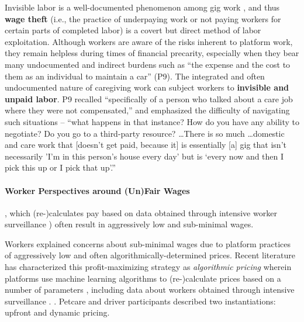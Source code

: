 {Invisible labor is a well-documented phenomenon among gig work \cite{l2xo,QNoU,EGjj,9Fa7}, and thus \textbf{wage theft} (i.e., the practice of underpaying work or not paying workers for certain parts of completed labor) is a covert but direct {method of labor exploitation}. 
Although workers are aware of the risks inherent to platform work, they remain helpless during times of financial precarity, especially when they bear many undocumented and indirect burdens such as ``the expense and the cost to them as an individual to maintain a car'' (P9). 
The integrated and often undocumented nature of caregiving work can subject workers to \textbf{invisible and unpaid labor}. P9 recalled ``specifically of a person who talked about a care job where they were not compensated,'' and emphasized the difficulty of navigating such situations – ``what happens in that instance? How do you have any ability to negotiate? Do you go to a third-party resource? \dots There is so much \dots domestic and care work that {[doesn't get paid, because it]} is essentially [a] gig that isn't necessarily 'I'm in this person's house every day' but is ‘every now and then I pick this up or I pick that up'.'' 

\paragraph{Worker Perspectives around (Un)Fair Wages}, which (re-)calculates pay based on data obtained through intensive worker surveillance \cite{dubal2023algorithmic, teachout2023algorithmic}) often result in aggressively low and sub-minimal wages.
}{Workers explained concerns about sub-minimal wages due to platform practices of aggressively low and often algorithmically-determined prices. 
Recent literature has characterized this profit-maximizing strategy \cite{dubal2023algorithmic} as \textit{algorithmic pricing} wherein {platforms use machine learning algorithms to (re-)calculate prices based on a number of parameters \cite{kloostra2022algorithmic, pignot2023pulling}, including data about workers obtained through intensive surveillance \cite{dubal2023algorithmic, teachout2023algorithmic}}. 
}
. Petcare and driver participants described two {instantiations}: upfront and dynamic pricing. %

